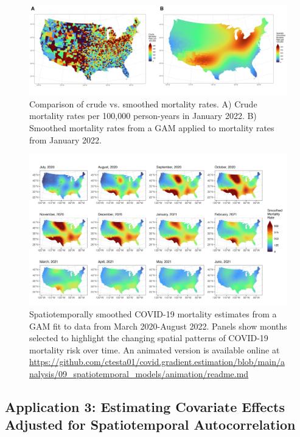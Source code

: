 \documentclass[
]{article}
\begin{document}
\begin{figure}
\includegraphics[width=1\linewidth]{figures/side_by_side_crude_and_smoothed} \caption{Comparison of crude vs. smoothed mortality rates. A) Crude mortality rates per 100,000 person-years in January 2022. B) Smoothed mortality rates from a GAM applied to mortality rates from January 2022.}\label{fig:crude-vs-smoothed}
\end{figure}

\begin{figure}
\includegraphics[width=1\linewidth]{figures/temporal_panel_figure} \caption{Spatiotemporally smoothed COVID-19 mortality estimates from a GAM fit to data from March 2020-August 2022. Panels show months selected to highlight the changing spatial patterns of COVID-19 mortality risk over time. An animated version is available online at \url{https://github.com/ctesta01/covid.gradient.estimation/blob/main/analysis/09_spatiotemporal_models/animation/readme.md}}\label{fig:spatiotemporal-panel-figure}
\end{figure}

\newpage

\hypertarget{application-3-estimating-covariate-effects-adjusted-for-spatiotemporal-autocorrelation}{%
\subsection{Application 3: Estimating Covariate Effects Adjusted for Spatiotemporal Autocorrelation}\label{application-3-estimating-covariate-effects-adjusted-for-spatiotemporal-autocorrelation}}
\end{document}
